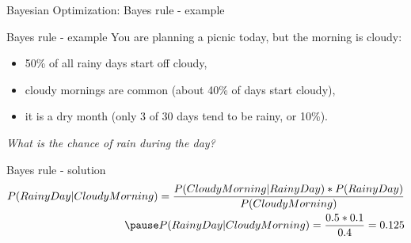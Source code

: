 \begin{frame}[c]{Bayesian Optimization: Bayes rule - example}

\begin{block}{Bayes rule - example}
    You are planning a picnic today, but the morning is cloudy: \pause
    \begin{itemize}
        \item 50\% of all rainy days start off cloudy, \pause
        \item cloudy mornings are common (about 40\% of days start cloudy), \pause
        \item it is a dry month (only 3 of 30 days tend to be rainy, or 10\%). \pause
    \end{itemize}
    
    \emph{What is the chance of rain during the day?}
\end{block}

 \pause

\begin{block}{Bayes rule - solution}
	\begin{equation*}
	\begin{aligned}
	    P(RainyDay \vert CloudyMorning) = \frac{P(CloudyMorning \vert RainyDay) * P(RainyDay)}{P(CloudyMorning)} \\  \pause
	    P(RainyDay \vert CloudyMorning) = \frac{0.5 * 0.1}{0.4} = 0.125
	\end{aligned}
	\end{equation*}
\end{block}

        
\end{frame}

